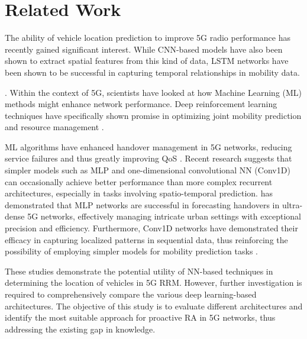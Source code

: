 \documentclass[conference]{IEEEtran}
\begin{document}
\section{Related Work} \label{related-work}
The ability of vehicle location prediction to improve 5G radio performance has recently gained significant interest. While CNN-based models have also been shown to extract spatial features from this kind of data, LSTM networks have been shown to be successful in capturing temporal relationships in mobility data. {\cite{9349962,7870510}. Within the context of 5G, scientists have looked at how Machine Learning (ML) methods might enhance network performance. Deep reinforcement learning techniques have specifically shown promise in optimizing joint mobility prediction and resource management \cite{7725934,tvt23choi}.

ML algorithms have enhanced handover management in 5G networks, reducing service failures and thus greatly improving QoS \cite{7792669,PRIYANKA2023100389}. Recent research suggests that simpler models such as MLP and one-dimensional convolutional NN (Conv1D) can occasionally achieve better performance than more complex recurrent architectures, especially in tasks involving spatio-temporal prediction. \cite{cikm23zhang} has demonstrated that MLP networks are successful in forecasting handovers in ultra-dense 5G networks, effectively managing intricate urban settings with exceptional precision and efficiency. Furthermore, Conv1D networks have demonstrated their efficacy in capturing localized patterns in sequential data, thus reinforcing the possibility of employing simpler models for mobility prediction tasks \cite{7870510}.

These studies demonstrate the potential utility of NN-based techniques in determining the location of vehicles in 5G RRM. However, further investigation is required to comprehensively compare the various deep learning-based architectures. The objective of this study is to evaluate different architectures and identify the most suitable approach for proactive RA in 5G networks, thus addressing the existing gap in knowledge.


}
\end{document}
